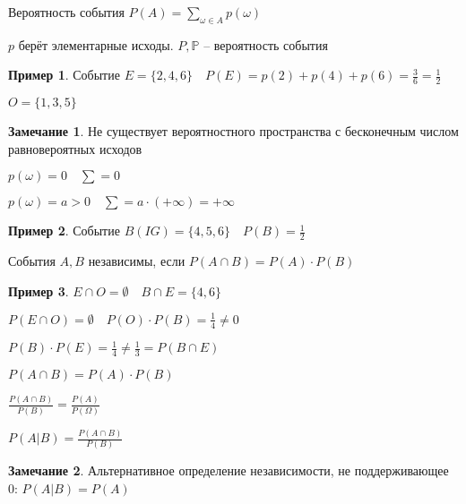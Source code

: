 \documentclass{book}
\renewcommand\O{\ensuremath{\emptyset}}
\theoremstyle{definition}
\newtheorem*{note}{Замечание}
\newtheorem*{example}{Пример}
\begin{document}
    \begin{definition}
        Вероятность события $P(A) = \sum\limits_{\omega\in A} p(\omega)$

        $p$ берёт элементарные исходы.  $P, \mathbb{P}$ -- вероятность события
    \end{definition}

    \begin{example}
        
        Событие $E = \{2, 4, 6\}\quad P(E) = p(2) + p(4) + p(6) = \frac{3}{6} = \frac{1}{2}$

        $O = \{1, 3, 5\}$
    \end{example}

    \begin{note}
        Не существует вероятностного пространства с бесконечным числом равновероятных исходов


        $p(\omega) = 0\quad \sum = 0$

        $p(\omega) = a >0\quad \sum = a\cdot (+\infty ) = +\infty $
    \end{note}

    \begin{example}
        Событие $B(IG) = \{4, 5, 6\} \quad P(B) = \frac{1}{2}$
    \end{example}

    \begin{definition}
         События $A, B$ независимы, если  $P(A\cap B) = P(A) \cdot  P(B)$
    \end{definition}

    \begin{example}
        $E\cap O = \O \quad B\cap E = \{4,6\}$

        $P(E\cap O) = \O \quad P(O)\cdot P(B) = \frac{1}{4}\neq 0$ 

        $P(B)\cdot P(E) = \frac{1}{4} \neq \frac{1}{3} = P(B\cap E)$
    \end{example}


    $P(A\cap B) = P(A)\cdot P(B)$

    $\frac{P(A\cap B)}{P(B)} = \frac{P(A)}{P(\Omega)}$

    \begin{definition}
        $P(A|B) = \frac{P(A\cap B)}{P(B)}$
    \end{definition}
    \begin{note}
        Альтернативное определение независимости, не поддерживающее 0: $P(A | B) = P(A)$
    \end{note}
\end{document}
